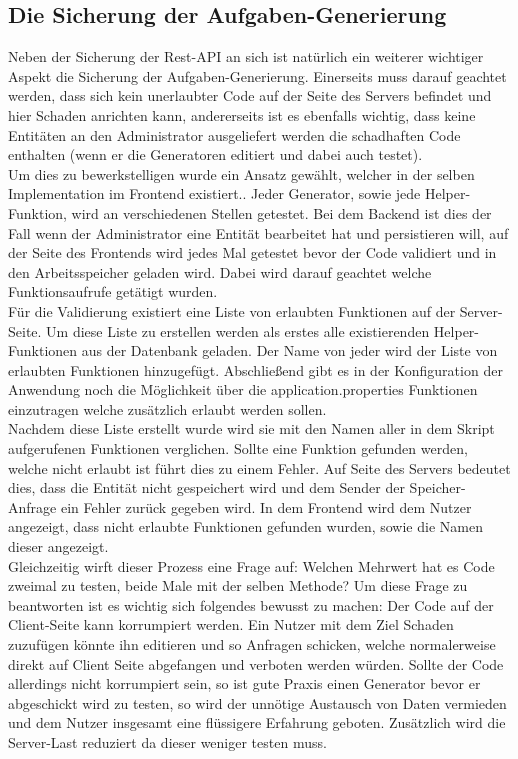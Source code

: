 \subsection{Die Sicherung der Aufgaben-Generierung}\label{GenerateTaskChapter}

Neben der Sicherung der Rest-API an sich ist natürlich ein weiterer wichtiger Aspekt die Sicherung der Aufgaben-Generierung. Einerseits muss darauf geachtet werden, dass sich kein unerlaubter Code auf der Seite des Servers befindet und hier Schaden anrichten kann, andererseits ist es ebenfalls wichtig, dass keine Entitäten an den Administrator ausgeliefert werden die schadhaften Code enthalten (wenn er die Generatoren editiert und dabei auch testet). \\

Um dies zu bewerkstelligen wurde ein Ansatz gewählt, welcher in der selben Implementation im Frontend existiert.. Jeder Generator, sowie jede Helper-Funktion, wird an verschiedenen Stellen getestet. Bei dem Backend ist dies der Fall wenn der Administrator eine Entität bearbeitet hat und persistieren will, auf der Seite des Frontends wird jedes Mal getestet bevor der Code validiert und in den Arbeitsspeicher geladen wird. Dabei wird darauf geachtet welche Funktionsaufrufe getätigt wurden. \\

Für die Validierung existiert eine Liste von erlaubten Funktionen auf der Server-Seite. Um diese Liste zu erstellen werden als erstes alle existierenden Helper-Funktionen aus der Datenbank geladen. Der Name von jeder wird der Liste von erlaubten Funktionen hinzugefügt. Abschließend gibt es in der Konfiguration der Anwendung noch die Möglichkeit über die application.properties Funktionen einzutragen welche zusätzlich erlaubt werden sollen. \\

Nachdem diese Liste erstellt wurde wird sie mit den Namen aller in dem Skript aufgerufenen Funktionen verglichen. Sollte eine Funktion gefunden werden, welche nicht erlaubt ist führt dies zu einem Fehler. Auf Seite des Servers bedeutet dies, dass die Entität nicht gespeichert wird und dem Sender der Speicher-Anfrage ein Fehler zurück gegeben wird. In dem Frontend wird dem Nutzer angezeigt, dass nicht erlaubte Funktionen gefunden wurden, sowie die Namen dieser angezeigt. \\

Gleichzeitig wirft dieser Prozess eine Frage auf: Welchen Mehrwert hat es Code zweimal zu testen, beide Male mit der selben Methode? Um diese Frage zu beantworten ist es wichtig sich folgendes bewusst zu machen: Der Code auf der Client-Seite kann korrumpiert werden. Ein Nutzer mit dem Ziel Schaden zuzufügen könnte ihn editieren und so Anfragen schicken, welche normalerweise direkt auf Client Seite abgefangen und verboten werden würden. Sollte der Code allerdings nicht korrumpiert sein, so ist gute Praxis einen Generator bevor er abgeschickt wird zu testen, so wird der unnötige Austausch von Daten vermieden und dem Nutzer insgesamt eine flüssigere Erfahrung geboten. Zusätzlich wird die Server-Last reduziert da dieser weniger testen muss.


